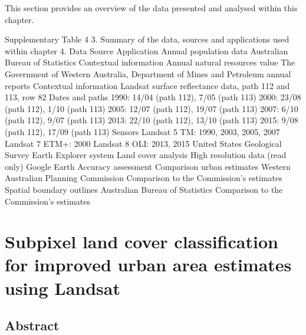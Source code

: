 \documentclass[]{book}
\begin{document}
This section provides an overview of the data presented and analysed
within this chapter.

Supplementary Table 4 3. Summary of the data, sources and applications
used within chapter 4. Data Source Application Annual population data
Australian Bureau of Statistics Contextual information Annual natural
resources value The Government of Western Australia, Department of Mines
and Petroleum annual reports Contextual information Landsat surface
reflectance data, path 112 and 113, row 82 Dates and paths 1990: 14/04
(path 112), 7/05 (path 113) 2000: 23/08 (path 112), 1/10 (path 113)
2005: 12/07 (path 112), 19/07 (path 113) 2007: 6/10 (path 112), 9/07
(path 113) 2013: 22/10 (path 112), 13/10 (path 113) 2015: 9/08 (path
112), 17/09 (path 113) Sensors Landsat 5 TM: 1990, 2003, 2005, 2007
Landsat 7 ETM+: 2000 Landsat 8 OLI: 2013, 2015 United States Geological
Survey Earth Explorer system Land cover analysis High resolution data
(read only) Google Earth Accuracy assessment Comparison urban estimates
Western Australian Planning Commission Comparison to the Commission's
estimates\\
Spatial boundary outlines Australian Bureau of Statistics Comparison to
the Commission's estimates

\chapter{Subpixel land cover classification for improved urban area
estimates using
Landsat}\label{subpixel-land-cover-classification-for-improved-urban-area-estimates-using-landsat}

\section{Abstract}\label{abstract-2}
\end{document}
